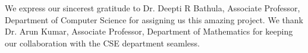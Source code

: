 

\begin{acknowledgements}      %


We express our sincerest gratitude to Dr. Deepti R Bathula, Associate Professor, Department of
Computer Science for assigning us this amazing project.
We thank Dr. Arun Kumar, Associate Professor, Department of Mathematics for keeping our
collaboration with the CSE department seamless.



\end{acknowledgements}


